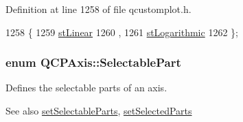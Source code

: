Definition at line 1258 of file qcustomplot.\+h.


\begin{DoxyCode}
1258                  \{
1259     \hyperlink{class_q_c_p_axis_a36d8e8658dbaa179bf2aeb973db2d6f0aff6e30a11a828bc850caffab0ff994f6}{stLinear} 
1260     ,
1261     \hyperlink{class_q_c_p_axis_a36d8e8658dbaa179bf2aeb973db2d6f0abf5b785ad976618816dc6f79b73216d4}{stLogarithmic} 
1262   \};
\end{DoxyCode}
\hypertarget{class_q_c_p_axis_abee4c7a54c468b1385dfce2c898b115f}{}
\subsubsection[{Selectable\+Part}]{\setlength{\rightskip}{0pt plus 5cm}enum {\bf Q\+C\+P\+Axis\+::\+Selectable\+Part}}\label{class_q_c_p_axis_abee4c7a54c468b1385dfce2c898b115f}
Defines the selectable parts of an axis. \begin{DoxySeeAlso}{See also}
\hyperlink{class_q_c_p_axis_a513f9b9e326c505d9bec54880031b085}{set\+Selectable\+Parts}, \hyperlink{class_q_c_p_axis_ab9d7a69277dcbed9119b3c1f25ca19c3}{set\+Selected\+Parts} 
\end{DoxySeeAlso}
